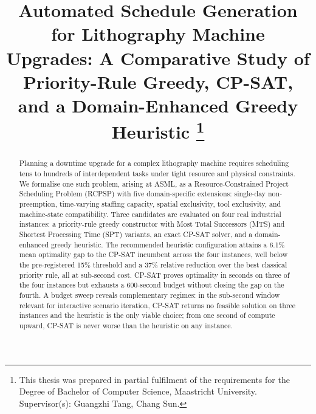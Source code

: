 \documentclass[conference]{IEEEtran}
\begin{document}
\title{Automated Schedule Generation for Lithography Machine
Upgrades: A Comparative Study of Priority-Rule Greedy, CP-SAT, and a
Domain-Enhanced Greedy Heuristic%
\thanks{This thesis was prepared in partial fulfilment of the requirements
for the Degree of Bachelor of Computer Science, Maastricht University.
Supervisor(s): Guangzhi Tang, Chang Sun.}
}

\author{
}

\maketitle

\begin{abstract}
Planning a downtime upgrade for a complex lithography machine
requires scheduling tens to hundreds of interdependent tasks under
tight resource and physical constraints. We formalise one such
problem, arising at ASML, as a Resource-Constrained Project
Scheduling Problem (RCPSP) with five domain-specific extensions:
single-day non-preemption, time-varying staffing capacity, spatial
exclusivity, tool exclusivity, and machine-state compatibility. Three
candidates are evaluated on four real industrial instances: a
priority-rule greedy constructor with Most Total Successors (MTS) and
Shortest Processing Time (SPT) variants, an exact CP-SAT solver, and
a domain-enhanced greedy heuristic. The recommended heuristic
configuration attains a 6.1\% mean optimality gap to the CP-SAT
incumbent across the four instances, well below the pre-registered
15\% threshold and a 37\% relative reduction over the best classical
priority rule, all at sub-second cost. CP-SAT proves optimality in
seconds on three of the four instances but exhausts a 600-second
budget without closing the gap on the fourth. A budget sweep reveals
complementary regimes: in the sub-second window relevant for
interactive scenario iteration, CP-SAT returns no feasible solution
on three instances and the heuristic is the only viable choice; from
one second of compute upward, CP-SAT is never worse than the
heuristic on any instance.
\end{abstract}
\end{document}
